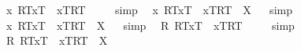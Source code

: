 \begin{isabellebody}
%
\endisadelimproof
\isanewline
\isanewline
{}\isamarkupfalse%
\ {\isachardoublequoteopen}{\isacharbrackleft}{\isacharparenleft}\isactrlbold {\isasymforall}x{\isachardot}\ {\isasymlparr}R\isactrlsup T{\isacharcomma}x\isactrlsup T{\isasymrparr}\ \isactrlbold {\isasymrightarrow}\ {\isasymlbrace}x\isactrlsup T{\isacharcomma}R\isactrlsup T{\isasymrbrace}{\isacharparenright}{\isacharbrackright}\ {\isacharequal}\ {\isacharasterisk}{\isachardoublequoteclose}%
\isadelimproof
\ %
\endisadelimproof
%
\isatagproof
{}\isamarkupfalse%
\ simp\ \isamarkupfalse%
%
\endisatagproof
{\isafoldproof}%
%
\isadelimproof
%
\endisadelimproof
\isanewline
{}\isamarkupfalse%
\ {\isachardoublequoteopen}{\isacharbrackleft}{\isacharparenleft}\isactrlbold {\isasymforall}x{\isachardot}\ {\isasymlparr}R\isactrlsup T{\isacharcomma}x\isactrlsup T{\isasymrparr}\ \isactrlbold {\isasymrightarrow}\ {\isasymlbrace}x\isactrlsup T{\isacharcomma}R\isactrlsup T{\isasymrbrace}{\isacharparenright}{\isacharbrackright}\ {\isacharequal}\ X{\isachardoublequoteclose}%
\isadelimproof
\ %
\endisadelimproof
%
\isatagproof
{}\isamarkupfalse%
\ simp\ \isamarkupfalse%
%
\endisatagproof
{\isafoldproof}%
%
\isadelimproof
%
\endisadelimproof
\isanewline
{}\isamarkupfalse%
\ {\isachardoublequoteopen}{\isacharparenleft}\isactrlbold {\isasymforall}x{\isachardot}\ {\isasymlparr}R\isactrlsup T{\isacharcomma}x\isactrlsup T{\isasymrparr}\ \isactrlbold {\isasymrightarrow}\ {\isasymlbrace}x\isactrlsup T{\isacharcomma}R\isactrlsup T{\isasymrbrace}{\isacharparenright}\ {\isacharequal}\ X{\isachardoublequoteclose}%
\isadelimproof
\ %
\endisadelimproof
%
\isatagproof
{}\isamarkupfalse%
\ simp\ \isamarkupfalse%
%
\endisatagproof
{\isafoldproof}%
%
\isadelimproof
%
\endisadelimproof
\isanewline
{}\isamarkupfalse%
\ {\isachardoublequoteopen}{\isacharbrackleft}{\isacharparenleft}\isactrlbold {\isasymforall}R{\isachardot}\ {\isasymlparr}R\isactrlsup T{\isacharcomma}x\isactrlsup T{\isasymrparr}\ \isactrlbold {\isasymrightarrow}\ {\isasymlbrace}x\isactrlsup T{\isacharcomma}R\isactrlsup T{\isasymrbrace}{\isacharparenright}{\isacharbrackright}\ {\isacharequal}\ {\isacharasterisk}{\isachardoublequoteclose}%
\isadelimproof
\ %
\endisadelimproof
%
\isatagproof
{}\isamarkupfalse%
\ simp\ \isamarkupfalse%
%
\endisatagproof
{\isafoldproof}%
%
\isadelimproof
%
\endisadelimproof
\isanewline
{}\isamarkupfalse%
\ {\isachardoublequoteopen}{\isacharparenleft}\isactrlbold {\isasymforall}R{\isachardot}\ {\isasymlparr}R\isactrlsup T{\isacharcomma}x\isactrlsup T{\isasymrparr}\ \isactrlbold {\isasymrightarrow}\ {\isasymlbrace}x\isactrlsup T{\isacharcomma}R\isactrlsup T{\isasymrbrace}{\isacharparenright}\ {\isacharequal}\ X{\isachardoublequoteclose}%

\end{isabellebody}
